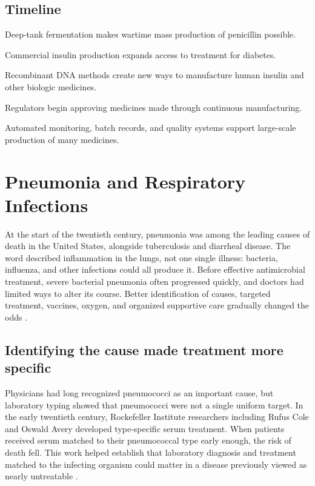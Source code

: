 \documentclass[12pt,oneside]{book}
\begin{document}
\section*{Timeline}
\begin{description}[leftmargin=2.3cm,style=nextline]
  \item[1940s] Deep-tank fermentation makes wartime mass production of penicillin possible.
  \item[1920s onward] Commercial insulin production expands access to treatment for diabetes.
  \item[1970s onward] Recombinant DNA methods create new ways to manufacture human insulin and other biologic medicines.
  \item[2010s onward] Regulators begin approving medicines made through continuous manufacturing.
  \item[Today] Automated monitoring, batch records, and quality systems support large-scale production of many medicines.
\end{description}

\chapter[Pneumonia and Respiratory Infections]{Pneumonia and Respiratory Infections}

At the start of the twentieth century, pneumonia was among the leading causes
of death in the United States, alongside tuberculosis and diarrheal disease.
The word described inflammation in the lungs, not one single illness:
bacteria, influenza, and other infections could all produce it. Before
effective antimicrobial treatment, severe bacterial pneumonia often
progressed quickly, and doctors had limited ways to alter its course. Better
identification of causes, targeted treatment, vaccines, oxygen, and organized
supportive care gradually changed the odds
\cite{cdcInfectiousControl1999,pneumoniaHistory}.

\section{Identifying the cause made treatment more specific}
Physicians had long recognized pneumococci as an important cause, but
laboratory typing showed that pneumococci were not a single uniform target.
In the early twentieth century, Rockefeller Institute researchers including
Rufus Cole and Oswald Avery developed type-specific serum treatment. When
patients received serum matched to their pneumococcal type early enough, the
risk of death fell. This work helped establish that laboratory diagnosis and
treatment matched to the infecting organism could matter in a disease
previously viewed as nearly untreatable \cite{pneumoniaHistory}.
\end{document}
